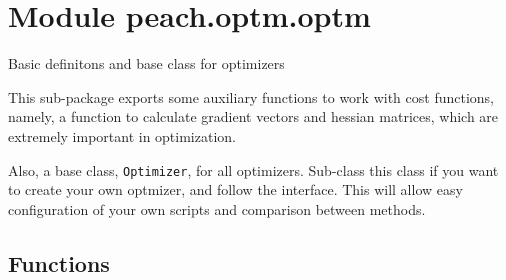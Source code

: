 %
%
%


\section{Module peach.optm.optm}

    \label{peach:optm:optm}

Basic definitons and base class for optimizers

This sub-package exports some auxiliary functions to work with cost functions,
namely, a function to calculate gradient vectors and hessian matrices, which are
extremely important in optimization.

Also, a base class, \texttt{Optimizer}, for all optimizers. Sub-class this class if
you want to create your own optmizer, and follow the interface. This will allow
easy configuration of your own scripts and comparison between methods.


  \subsection{Functions}

    \label{peach:optm:optm:gradient}

    \vspace{0.5ex}

